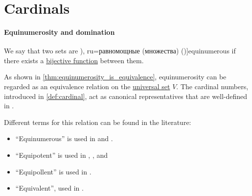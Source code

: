 \section{Cardinals}\label{sec:cardinals}

\paragraph{Equinumerosity and domination}

\begin{definition}\label{def:equinumerosity}
  We say that two sets are \term[bg=равномощни (множества) (\cite[79]{ГеновМиховскиМоллов1991Алгебра}), ru=равномощные (множества) (\cite[154]{КолмогоровДрагалин2006ЛогикаДополнительныеГлавы})]{equinumerous} if there exists a \hyperref[def:function_invertibility/bijective]{bijective function} between them.
\end{definition}
\begin{comments}
  \item As shown in \cref{thm:equinumerosity_is_equivalence}, equinumerosity can be regarded as an equivalence relation on the \hyperref[def:universal_set]{universal set} \( V \). The cardinal numbers, introduced in \cref{def:cardinal}, act as canonical representatives that are well-defined in \hyperref[def:zfc]{}.

  \item Different terms for this relation can be found in the literature:
  \begin{itemize}
    \item \enquote{Equinumerous} is used in
    \cite[129]{Enderton1977SetTheory} and
    \cite[xxi]{Mendelson2015Logic}.

    \item \enquote{Equipotent} is used in
    \cite[def. 6.2.32(ii)]{Hinman2005Logic},
    \cite[def. III.3.1]{Bourbaki2004TheoryOfSets},
    \cite[3]{Harzheim2005OrderedSets} and
    \cite[3]{Engelking1989GeneralTopology}

    \item \enquote{Equipollent} is used in \cite[28]{Kelley1975GeneralTopology}.

    \item \enquote{Equivalent}, used in \cite[52]{Halmos1960NaiveSetTheory}.
  \end{itemize}
\end{comments}


